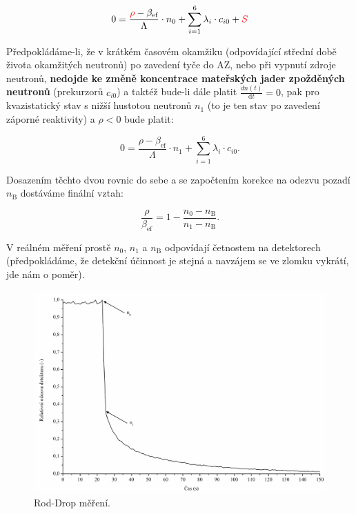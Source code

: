 \begin{equation*}
0 = \frac{\textcolor{red}{\rho}-\beta_{\text{ef}}}{\Lambda} \cdot n_0 + \sum_{i=1}^6 \lambda_i \cdot c_{i0} +\textcolor{red}{S}
\end{equation*}

Předpokládáme-li, že v krátkém časovém okamžiku (odpovídající střední době života okamžitých neutronů) po zavedení tyče do AZ, nebo při vypnutí zdroje neutronů, \textbf{nedojde ke změně koncentrace mateřských jader zpožděných neutronů} (prekurzorů $c_{i0}$) a taktéž bude-li dále platit $\frac{dn(t)}{\text{d}t} = 0$, pak pro kvazistatický stav s nižší hustotou neutronů $n_1$ (to je ten stav po zavedení záporné reaktivity) a $\rho < 0$ bude platit:

\begin{equation*}
0 = \frac{\rho-\beta_{\text{ef}}}{\Lambda} \cdot n_1 + \sum_{i=1}^6 \lambda_i \cdot c_{i0}.
\end{equation*}

Dosazením těchto dvou rovnic do sebe a se započtením korekce na odezvu pozadí $n_\text{B}$ dostáváme finální vztah:

\begin{equation}
    \boxed{ \dfrac{\rho}{\beta_\text{ef}}=1-\dfrac{n_0 - n_\text{B}}{n_1 -n_\text{B}}.}
\end{equation}

V reálném měření prostě $n_0$, $n_1$ a $n_\text{B}$ odpovídají četnostem na detektorech (předpokládáme, že detekční účinnost je stejná a navzájem se ve zlomku vykrátí, jde nám o poměr).

\begin{figure}[H]
    \centering
    \includegraphics[scale=0.35]{img/RodDropMěření.png}
    \caption{Rod-Drop měření.}
\end{figure}

